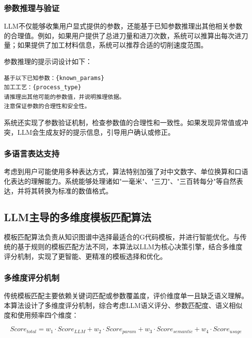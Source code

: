 \documentclass[preprint,12pt]{elsarticle}
\begin{document}
\subsubsection{参数推理与验证}

LLM不仅能够收集用户显式提供的参数，还能基于已知参数推理出其他相关参数的合理值。例如，如果用户提供了总进刀量和进刀次数，系统可以推算出每次进刀量；如果提供了加工材料信息，系统可以推荐合适的切削速度范围。

参数推理的提示词设计如下：

\begin{verbatim}
基于以下已知参数：{known_params}
加工工艺：{process_type}
请推理出其他可能的参数值，并说明推理依据。
注意保证参数的合理性和安全性。
\end{verbatim}

系统还实现了参数验证机制，检查参数值的合理性和一致性。如果发现异常值或冲突，LLM会生成友好的提示信息，引导用户确认或修正。

\subsubsection{多语言表达支持}

考虑到用户可能使用多种表达方式，算法特别加强了对中文数字、单位换算和口语化表达的理解能力。系统能够处理诸如"一毫米"、"三刀"、"三百转每分"等自然表达，并将其转换为标准的数值格式。

\subsection{LLM主导的多维度模板匹配算法}

模板匹配算法负责从知识图谱中选择最适合的G代码模板，并进行智能优化。与传统的基于规则的模板匹配方法不同，本算法以LLM为核心决策引擎，结合多维度评分机制，实现了更智能、更精准的模板选择和优化。

\subsubsection{多维度评分机制}

传统模板匹配主要依赖关键词匹配或参数覆盖度，评价维度单一且缺乏语义理解。本算法设计了多维度评分机制，综合考虑LLM语义评分、参数匹配度、语义相似度和使用频率四个维度：

\begin{equation}
Score_{total} = w_1 \cdot Score_{LLM} + w_2 \cdot Score_{param} + w_3 \cdot Score_{semantic} + w_4 \cdot Score_{usage}
\end{equation}
\end{document}
